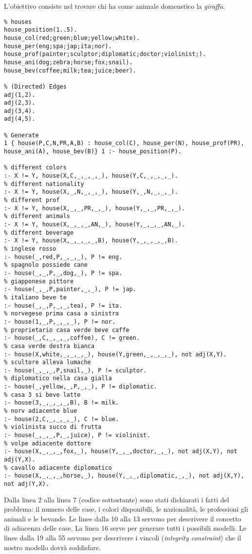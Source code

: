 L'obiettivo consiste nel trovare chi ha come animale domenstico la \emph{giraffa}.

\begin{lstlisting}
% houses
house_position(1..5).
house_col(red;green;blue;yellow;white).
house_per(eng;spa;jap;ita;nor).
house_prof(painter;sculptor;diplomatic;doctor;violinist;).
house_ani(dog;zebra;horse;fox;snail).
house_bev(coffee;milk;tea;juice;beer).

% (Directed) Edges
adj(1,2).
adj(2,3).
adj(3,4).
adj(4,5).

% Generate
1 { house(P,C,N,PR,A,B) : house_col(C), house_per(N), house_prof(PR), house_ani(A), house_bev(B)} 1 :- house_position(P).

% different colors
:- X != Y, house(X,C,_,_,_,_), house(Y,C,_,_,_,_).
% different nationality
:- X != Y, house(X,_,N,_,_,_), house(Y,_,N,_,_,_).
% different prof
:- X != Y, house(X,_,_,PR,_,_), house(Y,_,_,PR,_,_).
% different animals
:- X != Y, house(X,_,_,_,AN,_), house(Y,_,_,_,AN,_).
% different beverage
:- X != Y, house(X,_,_,_,_,B), house(Y,_,_,_,_,B).
% inglese rosso
:- house(_,red,P,_,_,_), P != eng.
% spagnolo possiede cane
:- house(_,_,P,_,dog,_), P != spa.
% giapponese pittore
:- house(_,_,P,painter,_,_), P != jap.
% italiano beve te
:- house(_,_,P,_,_,tea), P != ita.
% norvegese prima casa a sinistra
:- house(1,_,P,_,_,_), P != nor.
% proprietario casa verde beve caffe
:- house(_,C,_,_,_,coffee), C != green.
% casa verde destra bianca
:- house(X,white,_,_,_,_), house(Y,green,_,_,_,_), not adj(X,Y).
% scultore alleva lumache
:- house(_,_,_,P,snail,_), P != sculptor.
% diplomatico nella casa gialla
:- house(_,yellow,_,P,_,_), P != diplomatic.
% casa 3 si beve latte
:- house(3,_,_,_,_,B), B != milk.
% norv adiacente blue
:- house(2,C,_,_,_,_), C != blue.
% violinista succo di frutta
:- house(_,_,_,P,_,juice), P != violinist.
% volpe adiacente dottore
:- house(X,_,_,_,fox,_), house(Y,_,_,doctor,_,_), not adj(X,Y), not adj(Y,X).
% cavallo adiacente diplomatico
:- house(X,_,_,_,horse,_), house(Y,_,_,diplomatic,_,_), not adj(X,Y), not adj(Y,X).
\end{lstlisting}


Dalla linea 2 alla linea 7 (codice sottostante) sono stati dichiarati i fatti del problema: il numero delle case, i colori disponibili, le nazionalità, le professioni
gli animali e le bevande. Le linee dalla 10 alla 13 servono per descrivere il concetto di adiacenza delle case. La linea 16 serve per generare tutti i possibili modelli. Le linee dalla 19 alla 55 servono per descrivere i vincoli (\emph{integrity constraint}) che il nostro modello dovrà soddisfare.

